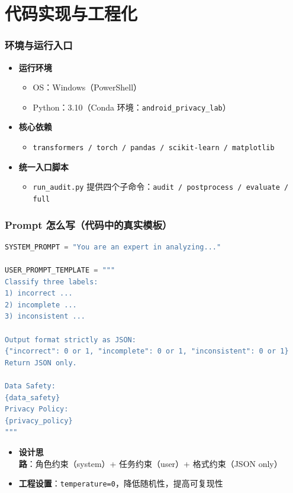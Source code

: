 \documentclass[AutoFakeBold,AutoFakeSlant]{beamer}
\begin{document}
\section{代码实现与工程化}
\begin{frame}
    \frametitle{环境与运行入口}
    \begin{itemize}
        \item \textbf{运行环境}
        \begin{itemize}
            \item OS：Windows（PowerShell）
            \item Python：3.10（Conda 环境：\texttt{android\_privacy\_lab}）
        \end{itemize}
        \item \textbf{核心依赖}
        \begin{itemize}
            \item \texttt{transformers / torch / pandas / scikit-learn / matplotlib}
        \end{itemize}
        \item \textbf{统一入口脚本}
        \begin{itemize}
            \item \texttt{run\_audit.py} 提供四个子命令：\texttt{audit / postprocess / evaluate / full}
        \end{itemize}
    \end{itemize}
\end{frame}

\begin{frame}[fragile]
    \frametitle{Prompt 怎么写（代码中的真实模板）}
    \scriptsize
\begin{lstlisting}[language=python]
SYSTEM_PROMPT = "You are an expert in analyzing..."

USER_PROMPT_TEMPLATE = """
Classify three labels:
1) incorrect ...
2) incomplete ...
3) inconsistent ...

Output format strictly as JSON:
{"incorrect": 0 or 1, "incomplete": 0 or 1, "inconsistent": 0 or 1}
Return JSON only.

Data Safety:
{data_safety}
Privacy Policy:
{privacy_policy}
"""
\end{lstlisting}
    \vspace{-0.4em}
    \begin{itemize}
        \item \textbf{设计思路}：角色约束（system）+ 任务约束（user）+ 格式约束（JSON only）
        \item \textbf{工程设置}：\texttt{temperature=0}，降低随机性，提高可复现性
    \end{itemize}
\end{frame}
\end{document}

